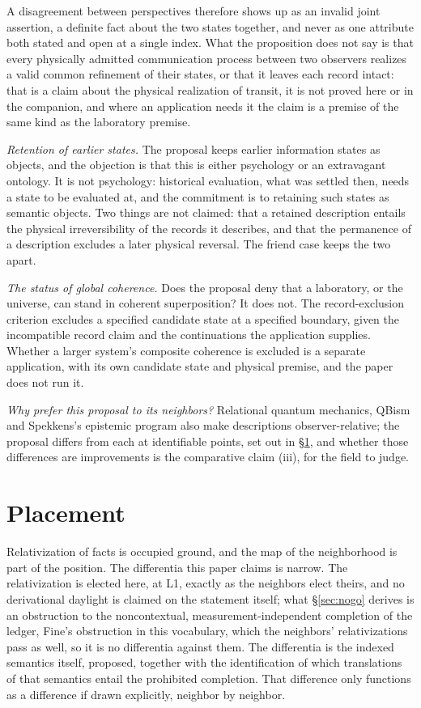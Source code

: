 \noindent A disagreement between perspectives therefore shows up as an invalid joint assertion, a definite fact about the two states together, and never as one attribute both stated and open at a single index. What the proposition does not say is that every physically admitted communication process between two observers realizes a valid common refinement of their states, or that it leaves each record intact: that is a claim about the physical realization of transit, it is not proved here or in the companion, and where an application needs it the claim is a premise of the same kind as the laboratory premise.

\textit{Retention of earlier states.} The proposal keeps earlier information states as objects, and the objection is that this is either psychology or an extravagant ontology. It is not psychology: historical evaluation, what was settled then, needs a state to be evaluated at, and the commitment is to retaining such states as semantic objects. Two things are not claimed: that a retained description entails the physical irreversibility of the records it describes, and that the permanence of a description excludes a later physical reversal. The friend case keeps the two apart.

\textit{The status of global coherence.} Does the proposal deny that a laboratory, or the universe, can stand in coherent superposition? It does not. The record-exclusion criterion excludes a specified candidate state at a specified boundary, given the incompatible record claim and the continuations the application supplies. Whether a larger system's composite coherence is excluded is a separate application, with its own candidate state and physical premise, and the paper does not run it.

\textit{Why prefer this proposal to its neighbors?} Relational quantum mechanics, QBism and Spekkens's epistemic program also make descriptions observer-relative; the proposal differs from each at identifiable points, set out in \S\ref{sec:placement}, and whether those differences are improvements is the comparative claim (iii), for the field to judge.

\section{Placement}\label{sec:placement}

Relativization of facts is occupied ground, and the map of the neighborhood is part of the position. The differentia this paper claims is narrow. The relativization is elected here, at L1, exactly as the neighbors elect theirs, and no derivational daylight is claimed on the statement itself; what \S\ref{sec:nogo} derives is an obstruction to the noncontextual, measurement-independent completion of the ledger, Fine's obstruction in this vocabulary, which the neighbors' relativizations pass as well, so it is no differentia against them. The differentia is the indexed semantics itself, proposed, together with the identification of which translations of that semantics entail the prohibited completion. That difference only functions as a difference if drawn explicitly, neighbor by neighbor.

